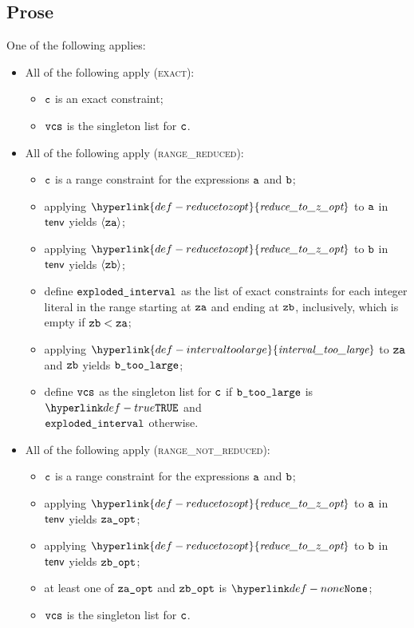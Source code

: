 \documentclass{book}
\newcommand\intervaltoolarge[0]{\hyperlink{def-intervaltoolarge}{\textfunc{interval\_too\_large}}}
\newcommand\reducetozopt[0]{\hyperlink{def-reducetozopt}{\textfunc{reduce\_to\_z\_opt}}}
\begin{document}
\subsection{Prose}
One of the following applies:
\begin{itemize}
  \item All of the following apply (\textsc{exact}):
  \begin{itemize}
    \item $\texttt{c}$ is an exact constraint;
    \item $\texttt{vcs}$ is the singleton list for $\texttt{c}$.
  \end{itemize}

  \item All of the following apply (\textsc{range\_reduced}):
  \begin{itemize}
    \item $\texttt{c}$ is a range constraint for the expressions $\texttt{a}$ and $\texttt{b}$;
    \item applying $\reducetozopt$ to $\texttt{a}$ in $\textsf{tenv}$ yields $\langle\texttt{za}\rangle$;
    \item applying $\reducetozopt$ to $\texttt{b}$ in $\textsf{tenv}$ yields $\langle\texttt{zb}\rangle$;
    \item define $\texttt{exploded\_interval}$ as the list of exact constraints for each integer literal in the range starting
          at $\texttt{za}$ and ending at $\texttt{zb}$, inclusively, which is empty if $\texttt{zb} < \texttt{za}$;
    \item applying $\intervaltoolarge$ to $\texttt{za}$ and $\texttt{zb}$ yields $\texttt{b\_too\_large}$;
    \item define $\texttt{vcs}$ as the singleton list for $\texttt{c}$ if $\texttt{b\_too\_large}$ is $\True$ and \\
          $\texttt{exploded\_interval}$ otherwise.
  \end{itemize}

  \item All of the following apply (\textsc{range\_not\_reduced}):
  \begin{itemize}
    \item $\texttt{c}$ is a range constraint for the expressions $\texttt{a}$ and $\texttt{b}$;
    \item applying $\reducetozopt$ to $\texttt{a}$ in $\textsf{tenv}$ yields $\texttt{za\_opt}$;
    \item applying $\reducetozopt$ to $\texttt{b}$ in $\textsf{tenv}$ yields $\texttt{zb\_opt}$;
    \item at least one of $\texttt{za\_opt}$ and $\texttt{zb\_opt}$ is $\None$;
    \item $\texttt{vcs}$ is the singleton list for $\texttt{c}$.
  \end{itemize}
\end{itemize}
\end{document}
